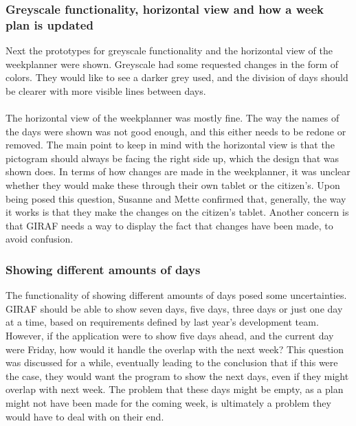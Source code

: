 \subsubsection{Greyscale functionality, horizontal view and how a week plan is updated}
Next the prototypes for greyscale functionality and the horizontal view of the weekplanner were shown.
Greyscale had some requested changes in the form of colors.
They would like to see a darker grey used, and the division of days should be clearer with more visible lines between days.
\\\\
The horizontal view of the weekplanner was mostly fine.
The way the names of the days were shown was not good enough, and this either needs to be redone or removed.
The main point to keep in mind with the horizontal view is that the pictogram should always be facing the right side up, which the design that was shown does.
In terms of how changes are made in the weekplanner, it was unclear whether they would make these through their own tablet or the citizen's.
Upon being posed this question, Susanne and Mette confirmed that, generally, the way it works is that they make the changes on the citizen's tablet.
Another concern is that GIRAF needs a way to display the fact that changes have been made, to avoid confusion.


\subsubsection{Showing different amounts of days}
The functionality of showing different amounts of days posed some uncertainties.
GIRAF should be able to show seven days, five days, three days or just one day at a time, based on requirements defined by last year's development team.
However, if the application were to show five days ahead, and the current day were Friday, how would it handle the overlap with the next week?
This question was discussed for a while, eventually leading to the conclusion that if this were the case, they would want the program to show the next days, even if they might overlap with next week.
The problem that these days might be empty, as a plan might not have been made for the coming week, is ultimately a problem they would have to deal with on their end.

